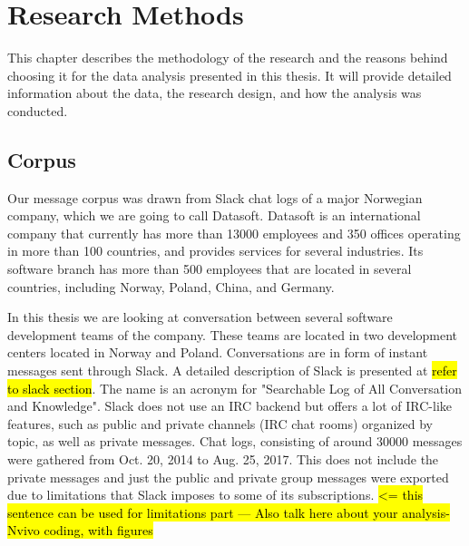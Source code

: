 \chapter{Research Methods}
This chapter describes the methodology of the research and the reasons behind choosing it for the data analysis presented in this thesis. It will provide detailed information about the data, the research design, and how the analysis was conducted.


\section{Corpus}
Our message corpus was drawn from Slack chat logs of a major Norwegian company, which we are going to call Datasoft. Datasoft is an international company that currently has more than 13000 employees and 350 offices operating in more than 100 countries, and provides services for several industries. Its software branch has more than 500 employees that are located in several countries, including Norway, Poland, China, and Germany. 

In this thesis we are looking at conversation between several software development teams of the company. These teams are located in two development centers located in Norway and Poland. Conversations are in form of instant messages sent through Slack. A detailed description of Slack is presented at \hl{refer to slack section}. The name is an acronym for "Searchable Log of All Conversation and Knowledge". Slack does not use an IRC backend but offers a lot of IRC-like features, such as public and private channels (IRC chat rooms) organized by topic, as well as private messages. 
Chat logs, consisting of around 30000 messages were gathered from Oct. 20, 2014 to Aug. 25, 2017. This does not include the private messages and just the public and private group messages were exported due to limitations that Slack imposes to some of its subscriptions. \hl{<= this sentence can be used for limitations part --- Also talk here about your analysis-Nvivo coding, with figures}

